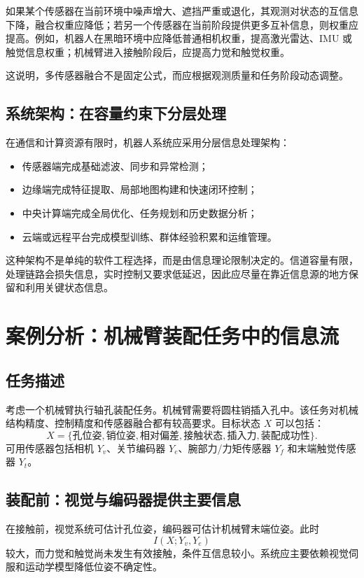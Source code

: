 \documentclass[UTF8,a4paper,12pt]{ctexart}
\begin{document}
如果某个传感器在当前环境中噪声增大、遮挡严重或退化，其观测对状态的互信息下降，融合权重应降低；若另一个传感器在当前阶段提供更多互补信息，则权重应提高。例如，机器人在黑暗环境中应降低普通相机权重，提高激光雷达、IMU 或触觉信息权重；机械臂进入接触阶段后，应提高力觉和触觉权重。

这说明，多传感器融合不是固定公式，而应根据观测质量和任务阶段动态调整。

\subsection{系统架构：在容量约束下分层处理}

在通信和计算资源有限时，机器人系统应采用分层信息处理架构：
\begin{itemize}
  \item 传感器端完成基础滤波、同步和异常检测；
  \item 边缘端完成特征提取、局部地图构建和快速闭环控制；
  \item 中央计算端完成全局优化、任务规划和历史数据分析；
  \item 云端或远程平台完成模型训练、群体经验积累和运维管理。
\end{itemize}

这种架构不是单纯的软件工程选择，而是由信息理论限制决定的。信道容量有限，处理链路会损失信息，实时控制又要求低延迟，因此应尽量在靠近信息源的地方保留和利用关键状态信息。

\section{案例分析：机械臂装配任务中的信息流}

\subsection{任务描述}

考虑一个机械臂执行轴孔装配任务。机械臂需要将圆柱销插入孔中。该任务对机械结构精度、控制精度和传感器融合都有较高要求。目标状态 $X$ 可以包括：
\[
X=\{\text{孔位姿},\text{销位姿},\text{相对偏差},\text{接触状态},\text{插入力},\text{装配成功性}\}.
\]
可用传感器包括相机 $Y_v$、关节编码器 $Y_e$、腕部力/力矩传感器 $Y_f$ 和末端触觉传感器 $Y_t$。

\subsection{装配前：视觉与编码器提供主要信息}

在接触前，视觉系统可估计孔位姿，编码器可估计机械臂末端位姿。此时
\begin{equation}
I(X;Y_v,Y_e)
\end{equation}
较大，而力觉和触觉尚未发生有效接触，条件互信息较小。系统应主要依赖视觉伺服和运动学模型降低位姿不确定性。
\end{document}
